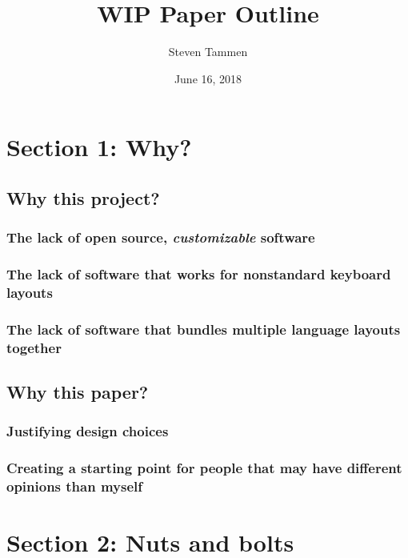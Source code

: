 \documentclass[11pt]{article}
\author{Steven Tammen}
\date{June 16, 2018}
\title{WIP Paper Outline}
\begin{document}
\maketitle
\setcounter{tocdepth}{2}
\tableofcontents



\section{Section 1: Why?}
\label{sec:org3fe19d9}

\subsection{Why this project?}
\label{sec:org36c0080}

\subsubsection{The lack of open source, \emph{customizable} software}
\label{sec:org400311f}

\subsubsection{The lack of software that works for nonstandard keyboard layouts}
\label{sec:org0e7d2ce}

\subsubsection{The lack of software that bundles multiple language layouts together}
\label{sec:orgf053a54}

\subsection{Why this paper?}
\label{sec:orgef9d508}

\subsubsection{Justifying design choices}
\label{sec:orgecc0b37}

\subsubsection{Creating a starting point for people that may have different opinions than myself}
\label{sec:org12fe263}

\section{Section 2: Nuts and bolts}
\label{sec:org7f81865}
\end{document}
